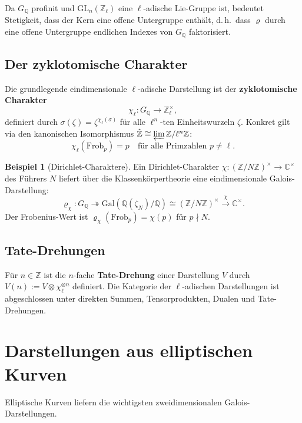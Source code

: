\documentclass[a4paper,12pt]{amsart}
\theoremstyle{definition}
\newtheorem{beispiel}[theorem]{Beispiel}
\theoremstyle{remark}
\newcommand{\Q}{\mathbb{Q}}
\newcommand{\Z}{\mathbb{Z}}
\newcommand{\Zl}{\mathbb{Z}_\ell}
\newcommand{\GL}{\mathrm{GL}}
\newcommand{\Frob}{\mathrm{Frob}}
\begin{document}
Da $G_\Q$ profinit und $\GL_n(\Zl)$ eine $\ell$-adische Lie-Gruppe ist, bedeutet
Stetigkeit, dass der Kern eine offene Untergruppe enthält, d.\,h.\ dass $\varrho$
durch eine offene Untergruppe endlichen Indexes von $G_\Q$ faktorisiert.

\subsection{Der zyklotomische Charakter}

Die grundlegende eindimensionale $\ell$-adische Darstellung ist der
\textbf{zyklotomische Charakter}
\[
  \chi_\ell\colon G_\Q \to \Zl^\times,
\]
definiert durch $\sigma(\zeta) = \zeta^{\chi_\ell(\sigma)}$ für alle $\ell^n$-ten
Einheitswurzeln $\zeta$. Konkret gilt via den kanonischen Isomorphismus
$\hat{\Z} \cong \varprojlim \Z/\ell^n\Z$:
\[
  \chi_\ell(\Frob_p) = p \quad \text{für alle Primzahlen } p \neq \ell.
\]

\begin{beispiel}[Dirichlet-Charaktere]
Ein Dirichlet-Charakter $\chi\colon (\Z/N\Z)^\times \to \mathbb{C}^\times$ des
Führers $N$ liefert über die Klassenkörpertheorie eine eindimensionale Galois-Darstellung:
\[
  \varrho_\chi\colon G_\Q \twoheadrightarrow \mathrm{Gal}(\Q(\zeta_N)/\Q)
  \cong (\Z/N\Z)^\times \xrightarrow{\chi} \mathbb{C}^\times.
\]
Der Frobenius-Wert ist $\varrho_\chi(\Frob_p) = \chi(p)$ für $p \nmid N$.
\end{beispiel}

\subsection{Tate-Drehungen}

Für $n \in \Z$ ist die $n$-fache \textbf{Tate-Drehung} einer Darstellung $V$ durch
$V(n) := V \otimes \chi_\ell^{\otimes n}$ definiert. Die Kategorie der $\ell$-adischen
Darstellungen ist abgeschlossen unter direkten Summen, Tensorprodukten, Dualen und
Tate-Drehungen.

\section{Darstellungen aus elliptischen Kurven}
\label{sec:elliptische-kurven}

Elliptische Kurven liefern die wichtigsten zweidimensionalen Galois-Darstellungen.
\end{document}
